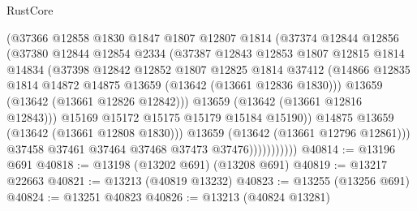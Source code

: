 \begin{lexlean}{RustCore}
\begin{coremodule}
                            (@37366
                              @12858
                              @1830
                              @1847
                              @1807
                              @12807
                              @1814
                              (@37374
                                @12844
                                @12856
                                (@37380
                                  @12844
                                  @12854
                                  @2334
                                  (@37387
                                    @12843
                                    @12853
                                    @1807
                                    @12815
                                    @1814
                                    @14834
                                    (@37398
                                      @12842
                                      @12852
                                      @1807
                                      @12825
                                      @1814
                                      @37412
                                      (@14866
                                        @12835
                                        @1814
                                        @14872
                                        @14875
                                        @13659
                                        (@13642 (@13661 @12836 @1830)))
                                      @13659
                                      (@13642 (@13661 @12826 @12842)))
                                    @13659
                                    (@13642 (@13661 @12816 @12843)))
                                  @15169
                                  @15172
                                  @15175
                                  @15179
                                  @15184
                                  @15190))
                              @14875
                              @13659
                              (@13642 (@13661 @12808 @1830)))
                            @13659
                            (@13642 (@13661 @12796 @12861)))
                          @37458
                          @37461
                          @37464
                          @37468
                          @37473
                          @37476)))))))))))
@40814 := @13196 @691
@40818 := @13198 (@13202 @691) (@13208 @691)
@40819 := @13217 @22663
@40821 := @13213 (@40819 @13232)
@40823 := @13255 (@13256 @691)
@40824 := @13251 @40823
@40826 := @13213 (@40824 @13281)

\end{coremodule}
\end{lexlean}
